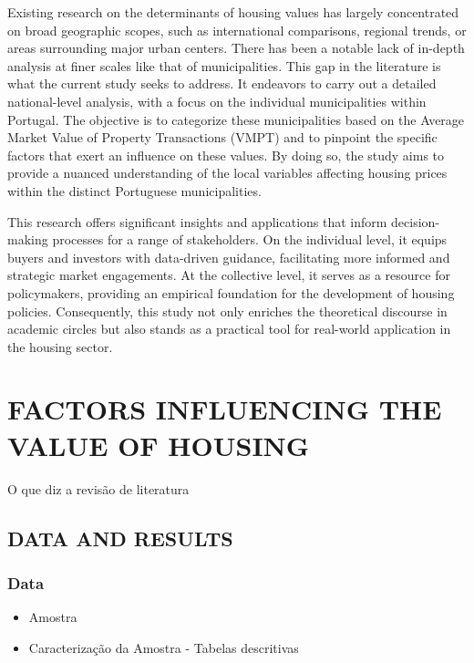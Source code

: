 \documentclass{aip-cp}
\begin{document}
Existing research on the determinants of housing values has largely concentrated on broad geographic scopes, such as international comparisons, regional trends, or areas surrounding major urban centers. There has been a notable lack of in-depth analysis at finer scales like that of municipalities. This gap in the literature is what the current study seeks to address. It endeavors to carry out a detailed national-level analysis, with a focus on the individual municipalities within Portugal. The objective is to categorize these municipalities based on the Average Market Value of Property Transactions (VMPT) and to pinpoint the specific factors that exert an influence on these values. By doing so, the study aims to provide a nuanced understanding of the local variables affecting housing prices within the distinct Portuguese municipalities.

This research offers significant insights and applications that inform decision-making processes for a range of stakeholders. On the individual level, it equips buyers and investors with data-driven guidance, facilitating more informed and strategic market engagements. At the collective level, it serves as a resource for policymakers, providing an empirical foundation for the development of housing policies. Consequently, this study not only enriches the theoretical discourse in academic circles but also stands as a practical tool for real-world application in the housing sector.



\section{\uppercase{Factors influencing the value of housing}}

O que diz a revisão de literatura \cite{Reference1}

\subsection{\uppercase{Data and Results}}
\subsubsection{Data}

\begin{itemize}
    \item Amostra
    \item Caracterização da Amostra - Tabelas descritivas 
\end{itemize}
\end{document}
